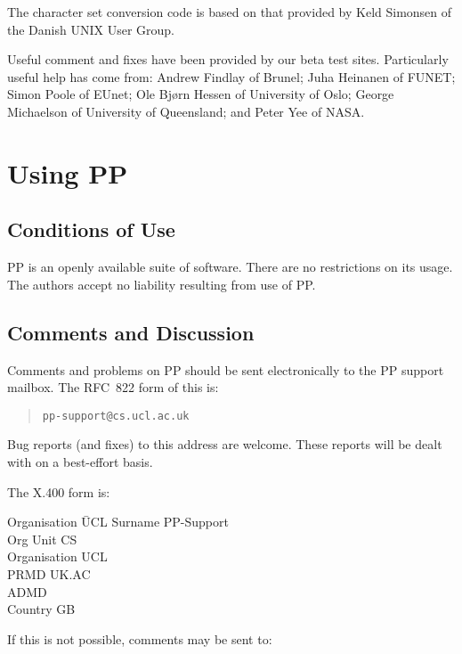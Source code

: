 The character set conversion code is based on that provided by
Keld Simonsen of the Danish UNIX User Group.

Useful comment and fixes have been provided by our beta test sites.
Particularly useful help has come from: Andrew Findlay of Brunel; Juha
Heinanen of FUNET; Simon Poole of EUnet; Ole Bj{\o}rn Hessen of University
of Oslo; George Michaelson of University of Queensland; and Peter Yee of NASA.

\chapter {Using PP}

\section {Conditions of Use}

PP is an openly available suite of software.  There are no
restrictions on its usage.  The authors accept no liability resulting
from use of PP.

\section {Comments and Discussion}

Comments and problems on PP should be sent electronically to the PP
support mailbox.  The RFC~822 form of this is:
\begin {quote}
\verb|pp-support@cs.ucl.ac.uk| 
\end {quote}
Bug reports (and fixes) to this address are welcome. These reports
will be dealt with on a best-effort basis.

The X.400 form is:

\begin {center}
\begin {tabbing}
Organisation \= UCL \kill
Surname \> PP-Support \\
Org Unit \> CS \\
Organisation \> UCL \\
PRMD \> UK.AC \\
ADMD \> \verb*| | \\
Country \> GB \\
\end {tabbing}
\end {center}

\pagebreak[4]

If this is not possible, comments may be sent to:

